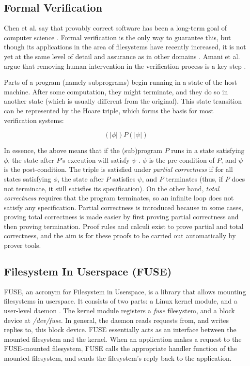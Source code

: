 \subsection{Formal Verification}
Chen et al. say that provably correct software has been a long-term goal of computer science \cite{chen2015specifying}.
Formal verification is the only way to guarantee this, but though its applications in the area of filesystems have recently increased, it is not yet at the same level of detail and assurance as in other domains \cite{amani2016}.
Amani et al. argue that removing human intervention in the verification process is a key step \cite{amani2016}.

Parts of a program (namely subprograms) begin running in a state of the host machine.
After some computation, they might terminate, and they do so in another state (which is usually different from the original).
This state transition can be represented by the Hoare triple, which forms the basis for most verification systems:

$$(\!|\phi|\!) P (\!|\psi|\!)$$

In essence, the above means that if the (sub)program $P$ runs in a state satisfying $\phi$, the state after $P$'s execution will satisfy $\psi$ \cite{huth2004}.
$\phi$ is the pre-condition of $P$, and $\psi$ is the post-condition.
The triple is satisfied under \textit{partial correctness} if for all states satisfying $\phi$, the state after $P$ satisfies $\psi$, and $P$ terminates (thus, if $P$ does not terminate, it still satisfies its specification).
On the other hand, \textit{total correctness} requires that the program terminates, so an infinite loop does not satisfy any specification.
Partial correctness is introduced because in some cases, proving total correctness is made easier by first proving partial correctness and then proving termination.
Proof rules and calculi exist to prove partial and total correctness, and the aim is for these proofs to be carried out automatically by prover tools.

\subsection{Filesystem In Userspace (FUSE)}
FUSE, an acronym for Filesystem in Userspace, is a library that allows mounting filesystems in userspace.
It consists of two parts: a Linux kernel module, and a user-level daemon \cite{vangoor2017}.
The kernel module registers a \textit{fuse} filesystem, and a block device at \textit{/dev/fuse}.
In general, the daemon reads requests from, and writes replies to, this block device.
FUSE essentially acts as an interface between the mounted filesystem and the kernel.
When an application makes a request to the FUSE-mounted filesystem, FUSE calls the appropriate handler function of the mounted filesystem, and sends the filesystem's reply back to the application.

